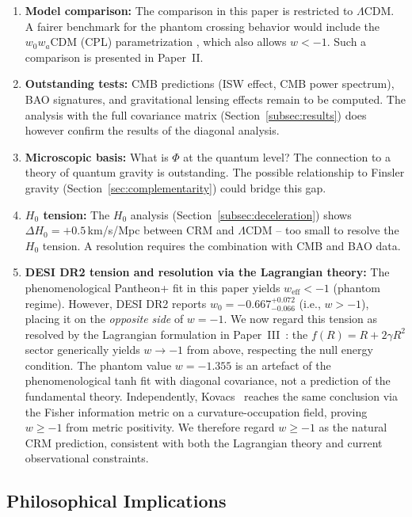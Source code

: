 \documentclass[aps,prd,twocolumn,superscriptaddress,nofootinbib]{revtex4-2}
\begin{document}
\begin{enumerate}
\item \textbf{Model comparison:} The comparison in this paper is restricted to $\Lambda$CDM. A fairer benchmark for the phantom crossing behavior would include the $w_0w_a$CDM (CPL) parametrization \cite{Chevallier2001, Linder2003}, which also allows $w < -1$. Such a comparison is presented in Paper~II.
\item \textbf{Outstanding tests:} CMB predictions (ISW effect, CMB power spectrum), BAO signatures, and gravitational lensing effects remain to be computed. The analysis with the full covariance matrix (Section~\ref{subsec:results}) does however confirm the results of the diagonal analysis.
\item \textbf{Microscopic basis:} What is $\Phi$ at the quantum level? The connection to a theory of quantum gravity is outstanding. The possible relationship to Finsler gravity (Section~\ref{sec:complementarity}) could bridge this gap.
\item \textbf{$H_0$ tension:} The $H_0$ analysis (Section~\ref{subsec:deceleration}) shows $\Delta H_0 = +0.5\,$km/s/Mpc between CRM and $\Lambda$CDM -- too small to resolve the $H_0$ tension. A resolution requires the combination with CMB and BAO data.
\item \textbf{DESI DR2 tension and resolution via the Lagrangian theory:} The phenomenological Pantheon+ fit in this paper yields $w_{\mathrm{eff}} < -1$ (phantom regime). However, DESI DR2 \cite{DESI2025} reports $w_0 = -0.667^{+0.072}_{-0.066}$ (i.e., $w > -1$), placing it on the \textit{opposite side} of $w = -1$. We now regard this tension as resolved by the Lagrangian formulation in Paper~III~\cite{Geiger2026c}: the $f(R) = R + 2\gamma R^2$ sector generically yields $w \to -1$ from above, respecting the null energy condition. The phantom value $w = -1.355$ is an artefact of the phenomenological tanh fit with diagonal covariance, not a prediction of the fundamental theory. Independently, Kovacs~\cite{Kovacs2026} reaches the same conclusion via the Fisher information metric on a curvature-occupation field, proving $w \geq -1$ from metric positivity. We therefore regard $w \geq -1$ as the natural CRM prediction, consistent with both the Lagrangian theory and current observational constraints.
\end{enumerate}


\subsection{Philosophical Implications}
\end{document}
